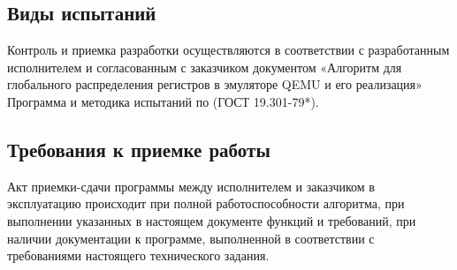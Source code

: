 \subsection{Виды испытаний}
Контроль и приемка разработки осуществляются в соответствии с разработанным исполнителем и согласованным с заказчиком документом «Алгоритм для глобального распределения регистров в эмуляторе QEMU и его реализация» Программа и методика испытаний по (ГОСТ 19.301-79*).

\subsection{Требования к приемке работы}
Акт приемки-сдачи программы между исполнителем и заказчиком в эксплуатацию происходит при полной работоспособности алгоритма, при выполнении указанных в настоящем документе функций и требований, при наличии документации к программе, выполненной в соответствии с требованиями настоящего технического задания.